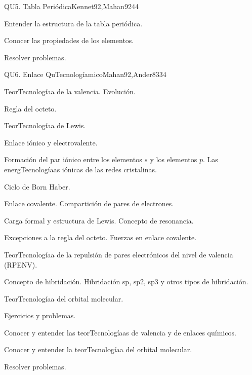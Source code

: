 \begin{syllabus}
\begin{unit}{}{QU5. Tabla Periódica}{Kennet92,Mahan92}{4}{4}
   \begin{learningoutcomes}
      \item Entender la estructura de la tabla periódica.
      \item Conocer las propiedades de los elementos.
      \item Resolver problemas.
   \end{learningoutcomes}
\end{unit}

\begin{unit}{}{QU6. Enlace QuTecnologíamico}{Mahan92,Ander83}{3}{4}
   \begin{topics}
	\item TeorTecnologíaa de  la valencia. Evolución.
	\item Regla del octeto.
	\item TeorTecnologíaa de Lewis.
	\item Enlace iónico y electrovalente.
	\item Formación del par iónico entre los elementos $s$ y los elementos $p$. Las energTecnologíaas iónicas de las redes cristalinas.
	\item Ciclo de Born Haber.
	\item Enlace covalente. Compartición de pares de electrones.
	\item Carga formal y estructura de Lewis. Concepto de resonancia.
	\item Excepciones a la regla del octeto. Fuerzas en enlace covalente.
	\item TeorTecnologíaa de la repulsión de pares electrónicos del nivel de valencia (RPENV).
	\item Concepto de hibridación. Hibridación sp, sp2, sp3 y otros tipos de hibridación.
	\item TeorTecnologíaa del orbital molecular.
	\item Ejercicios y problemas.
   \end{topics}

   \begin{learningoutcomes}
      \item Conocer y entender las teorTecnologíaas de valencia y de enlaces químicos.
      \item Conocer y entender la teorTecnologíaa del orbital molecular.
      \item Resolver problemas.
   \end{learningoutcomes}
\end{unit}


\end{syllabus}
